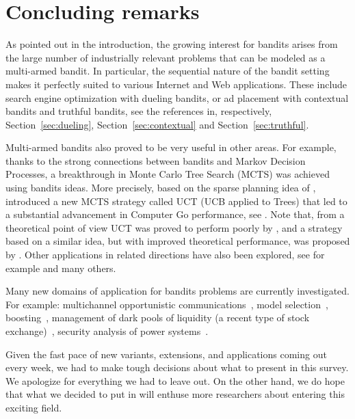 \section{Concluding remarks}
As pointed out in the introduction, the growing interest for bandits arises from the large number of industrially relevant problems that can be modeled as a multi-armed bandit. In particular, the sequential nature of the bandit setting makes it perfectly suited to various Internet and Web applications. These include search engine optimization with dueling bandits, or ad placement with contextual bandits and truthful bandits, see the references in, respectively, Section~\ref{sec:dueling}, Section~\ref{sec:contextual} and Section~\ref{sec:truthful}.

Multi-armed bandits also proved to be very useful in other areas. For example, thanks to the strong connections between bandits and Markov Decision Processes, a breakthrough in Monte Carlo Tree Search (MCTS) was achieved using bandits ideas. More precisely, based on the sparse planning idea of \cite{KMN02}, \cite{KS06} introduced a new MCTS strategy called UCT (UCB applied to Trees) that led to a substantial advancement in Computer Go performance, see \cite{GWMT06}. Note that, from a theoretical point of view UCT was proved to perform poorly by \cite{CM07}, and a strategy based on a similar idea, but with improved theoretical performance, was proposed by \cite{BM10}. Other applications in related directions have also been explored, see for example \cite{TT09, HT10b} and many others.

Many new domains of application for bandits problems are currently investigated. For example: multichannel opportunistic communications~\cite{LZK10}, model selection~\cite{ADBL11}, boosting~\cite{BK11}, management of dark pools of liquidity (a recent type of stock exchange)~\cite{ABD10}, security analysis of power systems~\cite{BEG11}.

Given the fast pace of new variants, extensions, and applications coming out every week, we had to make tough decisions about what to present in this survey. We apologize for everything we had to leave out. On the other hand, we do hope that what we decided to put in will enthuse more researchers about entering this exciting field.
